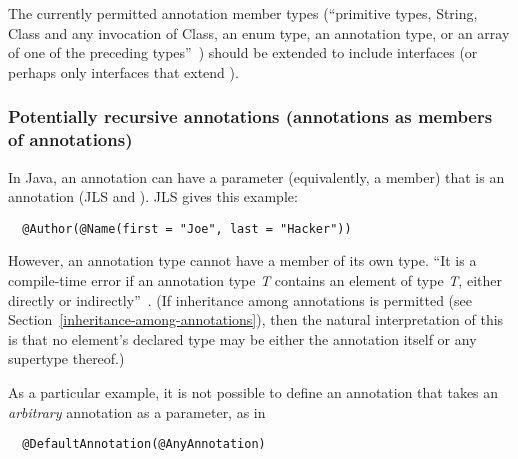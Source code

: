 \documentclass[10pt]{article}
\begin{document}
The currently permitted annotation member types (``primitive types, String,
Class and any invocation of Class, an enum type, an annotation type, or an
array of one of the preceding types''~\cite[\S9.6]{GoslingJSB2005}) should
be extended to include interfaces (or perhaps only interfaces that extend
).






\subsubsection{Potentially recursive annotations (annotations as members of annotations)\label{annotations-as-members}\label{annotations-as-arguments}\label{recursive-annotations}}

In Java, an annotation can have a parameter (equivalently, a member) that is an
annotation (JLS
 and
).
JLS
gives this example:

\begin{Verbatim}
  @Author(@Name(first = "Joe", last = "Hacker"))
\end{Verbatim}

However, an annotation type cannot have a member of its own type.
``It is a compile-time error if an annotation type \emph{T} contains an
element of type \emph{T}, either directly or
indirectly''~\cite[\S9.6]{GoslingJSB2005}.
(If inheritance among annotations is permitted (see
Section~\ref{inheritance-among-annotations}), then the natural
interpretation of this is that no element's declared type may be either the
annotation itself or any supertype thereof.)

As a particular example, it is not possible to define an annotation that
takes an \emph{arbitrary} annotation as a parameter, as in

\begin{Verbatim}
  @DefaultAnnotation(@AnyAnnotation)
\end{Verbatim}
\end{document}
